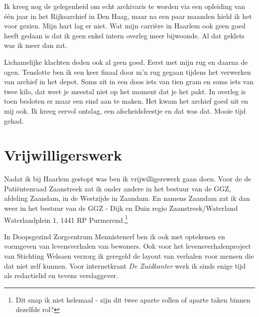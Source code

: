 \documentclass[10pt,twoside, openright]{memoir}
\begin{document}
Ik kreeg nog de gelegenheid om echt archivaris te worden via een opleiding van één jaar in het Rijksarchief in Den Haag, maar na een paar maanden hield ik het voor gezien. Mijn hart lag er niet. Wat mijn carrière in Haarlem ook geen goed heeft gedaan is dat ik geen enkel intern overleg meer bijwoonde. Al dat geklets was ik meer dan zat. 

Lichamelijke klachten deden ook al geen goed. Eerst met mijn rug en daarna de ogen. Tenslotte ben ik een keer finaal door m’n rug gegaan tijdens het verwerken van archief in het depot. Soms zit in een doos iets van tien gram en soms iets van twee kilo, dat weet je meestal niet op het moment dat je het pakt. In overleg is toen besloten er maar een eind aan te maken. Het kwam het archief goed uit en mij ook. Ik kreeg eervol ontslag, een afscheidsfeestje en dat was dat. Mooie tijd gehad.

\section{Vrijwilligerswerk} %
\label{cha:vrijwilligerswerk}

Nadat ik bij Haarlem gestopt was ben ik vrijwilligerswerk gaan doen. Voor de de Patiëntenraad Zaanstreek zat ik onder andere in het bestuur van de GGZ, afdeling Zaandam, in de Westzijde in Zaandam. En namens Zaandam zat ik dan weer in het bestuur van de GGZ - Dijk en Duin regio Zaanstreek/Waterland Waterlandplein 1, 1441 RP Purmerend.\footnote{Dit snap ik niet helemaal - zijn dit twee aparte rollen of aparte taken binnen dezelfde rol?} 

In Doopsgezind Zorgcentrum Mennistenerf ben ik ook met optekenen en vormgeven van levensverhalen van bewoners. Ook voor het levensverhalenproject van Stichting Welsaen verzorg ik geregeld de layout van verhalen voor mensen die dat niet zelf kunnen. Voor internetkrant \emph{De Zuidkanter} werk ik sinds enige tijd als redactielid en tevens verslaggever.
\end{document}

